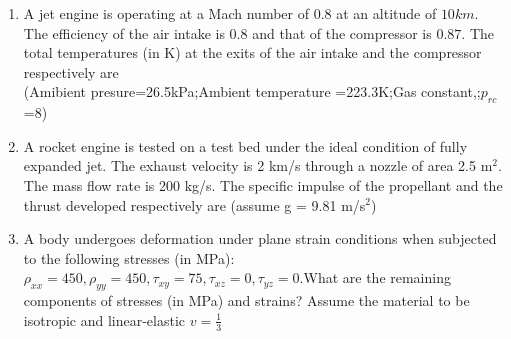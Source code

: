 \documentclass[journal,12pt,onecolumn]{IEEEtran}
\theoremstyle{remark}
\begin{document}
\begin{enumerate}
\item A jet engine is operating at a Mach number of $0.8$ at an altitude of $10 km$. The efficiency of the air intake is $0.8$ and that of the compressor is $0.87$. The total temperatures (in K) at the exits of the air intake and the compressor respectively are\\
	(Amibient presure=26.5kPa;Ambient temperature =223.3K;Gas constant,;$p_{rc}$=8)
\begin{enumerate}
\end{enumerate}

\item  A rocket engine is tested on a test bed under the ideal condition of fully expanded jet. The exhaust velocity is 2 km/s through a nozzle of area 2.5 m$^2$. The mass flow rate is 200 kg/s. The specific
impulse of the propellant and the thrust developed respectively are (assume g = 9.81 m/s$^2$)
\begin{enumerate}
\end{enumerate}

\item A body undergoes deformation under plane strain conditions when subjected to the following
	stresses (in MPa): $\rho_{xx}=450,\rho_{yy}=450,\tau_{xy}=75,\tau_{xz}=0,\tau_{yz}=0$.What are the remaining components of stresses (in MPa) and strains? Assume the material to be isotropic and linear-elastic $v=\frac{1}{3}$
\begin{enumerate}
\end{enumerate}


\end{enumerate}
\end{document}
